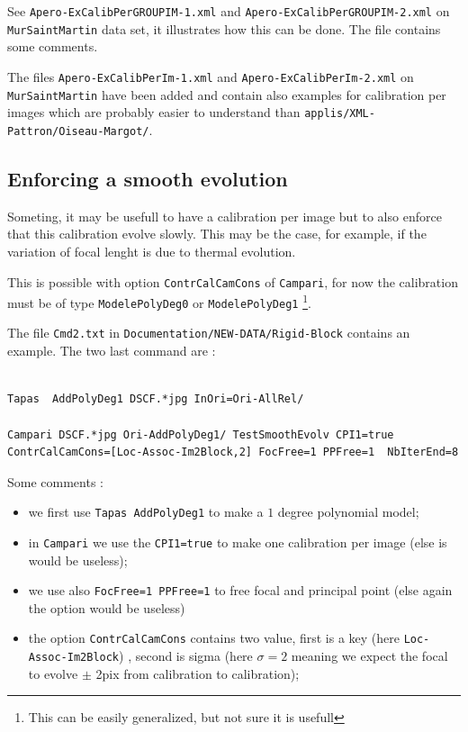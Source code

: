 See {\tt Apero-ExCalibPerGROUPIM-1.xml} and
{\tt Apero-ExCalibPerGROUPIM-2.xml}  on  {\tt MurSaintMartin} data
set, it illustrates how this can be done. The file contains
some comments.


The files {\tt Apero-ExCalibPerIm-1.xml} and {\tt Apero-ExCalibPerIm-2.xml}
on  {\tt MurSaintMartin} have been added and contain also
examples for calibration per images which are probably easier to understand
than {\tt  applis/XML-Pattron/Oiseau-Margot/}.




\subsection{Enforcing a smooth evolution}

Someting, it may be usefull to have a calibration per image but to also
enforce that this calibration evolve slowly. This may be the case,
for example, if the  variation of focal lenght is due to thermal evolution.

This is possible with option {\tt  ContrCalCamCons} of {\tt Campari}, for now
the calibration must be of type {\tt ModelePolyDeg0} or {\tt ModelePolyDeg1}
\footnote{This can be easily generalized, but not sure it is usefull}.

The file {\tt Cmd2.txt} in {\tt Documentation/NEW-DATA/Rigid-Block} contains an example. The two last command are  :

\begin{verbatim}

Tapas  AddPolyDeg1 DSCF.*jpg InOri=Ori-AllRel/

Campari DSCF.*jpg Ori-AddPolyDeg1/ TestSmoothEvolv CPI1=true ContrCalCamCons=[Loc-Assoc-Im2Block,2] FocFree=1 PPFree=1  NbIterEnd=8
\end{verbatim}

Some comments :

\begin{itemize}
   \item   we first use {\tt Tapas AddPolyDeg1} to make a $1$  degree polynomial model;
   \item   in {\tt Campari} we use the {\tt CPI1=true} to  make one calibration per image (else is would be useless);
   \item    we use also {\tt FocFree=1 PPFree=1} to free focal and principal point (else again the option would be useless)
   \item     the option {\tt ContrCalCamCons} contains two value, first is a key (here {\tt Loc-Assoc-Im2Block})
             , second is sigma (here $\sigma=2$ meaning we expect the focal to evolve $\pm$ 2pix from calibration to calibration);
\end{itemize}

